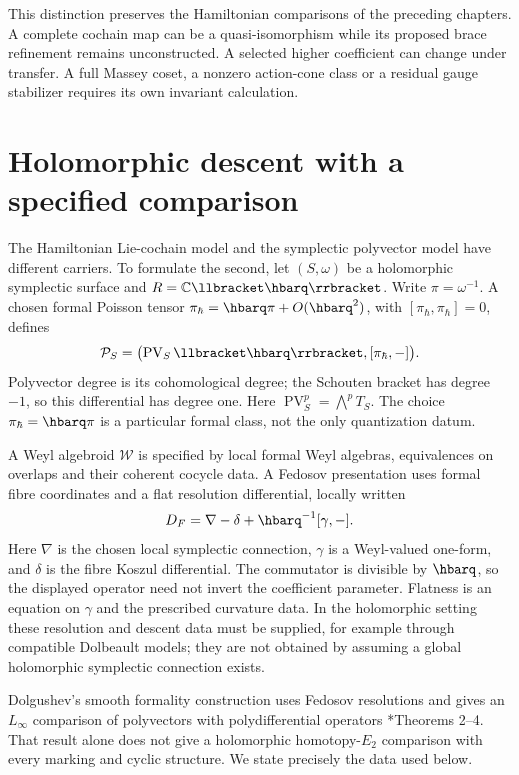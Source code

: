 This distinction preserves the Hamiltonian comparisons of
the preceding chapters. A complete cochain map can be a
quasi-isomorphism while its proposed brace refinement remains
unconstructed. A selected higher coefficient can change under
transfer. A full Massey coset, a nonzero action-cone class or
a residual gauge stabilizer requires its own invariant
calculation.

\section{Holomorphic descent with a specified comparison}
\label{sec:vol2-marked-holomorphic-descent}

The Hamiltonian Lie-cochain model and the symplectic
polyvector model have different carriers. To formulate the
second, let \((S,\omega)\) be a holomorphic symplectic
surface and \(R=\mathbb C\llbracket\hbarq\rrbracket\).
Write \(\pi=\omega^{-1}\). A chosen formal Poisson tensor
\(\pi_\hbar=\hbarq\pi+O(\hbarq^2)\), with
\([\pi_\hbar,\pi_\hbar]=0\), defines
\[
 \mathcal P_S=
 \bigl(\operatorname{PV}_S\llbracket\hbarq\rrbracket,
                  [\pi_\hbar,-]\bigr).
\]
Polyvector degree is its cohomological degree; the Schouten
bracket has degree \(-1\), so this differential has degree one.
Here \(\operatorname{PV}_S^p=\bigwedge^pT_S\).
The choice \(\pi_\hbar=\hbarq\pi\) is a particular formal
class, not the only quantization datum.

A Weyl algebroid \(\mathcal W\) is specified by local
formal Weyl algebras, equivalences on overlaps and their
coherent cocycle data. A Fedosov presentation uses formal
fibre coordinates and a flat resolution differential, locally
written
\[
 D_F=\nabla-\delta+\hbarq^{-1}[\gamma,-].
\]
Here \(\nabla\) is the chosen local symplectic connection,
\(\gamma\) is a Weyl-valued one-form, and \(\delta\) is the
fibre Koszul differential. The
commutator is divisible by \(\hbarq\), so the displayed
operator need not invert the coefficient parameter.
Flatness is an equation on \(\gamma\) and the prescribed
curvature data. In the holomorphic setting these resolution
and descent data must be supplied, for example through
compatible Dolbeault models; they are not obtained by
assuming a global holomorphic symplectic connection exists.

Dolgushev's smooth formality construction uses Fedosov
resolutions and gives an \(L_\infty\) comparison of
polyvectors with polydifferential operators
\cite{DolgushevCov}*{Theorems 2--4}. That result alone
does not give a holomorphic homotopy-\(E_2\) comparison
with every marking and cyclic structure. We state precisely
the data used below.


